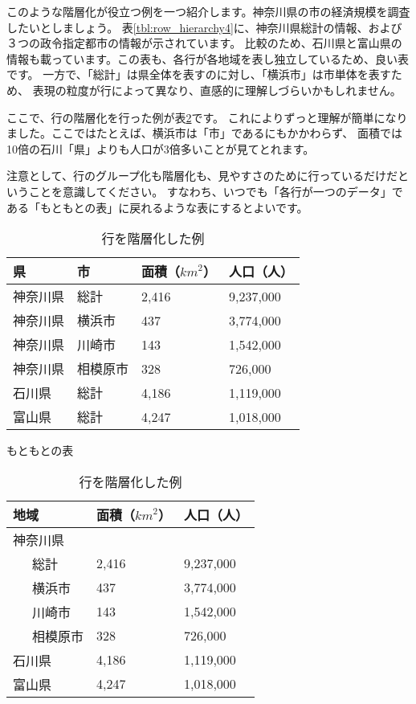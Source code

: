\documentclass[uplatex,onecolumn,9pt,dvipdfmx]{jsarticle}
\newcommand{\Tref}[1]{表\ref{#1}}
\begin{document}
このような階層化が役立つ例を一つ紹介します。神奈川県の市の経済規模を調査したいとしましょう。
\Tref{tbl:row_hierarchy4}に、神奈川県総計の情報、および３つの政令指定都市の情報が示されています。
比較のため、石川県と富山県の情報も載っています。この表も、各行が各地域を表し独立しているため、良い表です。
一方で、「総計」は県全体を表すのに対し、「横浜市」は市単体を表すため、
表現の粒度が行によって異なり、直感的に理解しづらいかもしれません。

ここで、行の階層化を行った例が\Tref{tbl:row_hierarchy5}です。
これによりずっと理解が簡単になりました。ここではたとえば、横浜市は「市」であるにもかかわらず、
面積では10倍の石川「県」よりも人口が3倍多いことが見てとれます。

注意として、行のグループ化も階層化も、見やすさのために行っているだけだということを意識してください。
すなわち、いつでも「各行が一つのデータ」である「もともとの表」に戻れるような表にするとよいです。

\begin{table}[h]
    \begin{minipage}[t]{0.48\linewidth}
        \centering
        \begin{tabular}{@{}llll@{}} \toprule
            県 & 市 & 面積（${km}^2$） & 人口（人） \\ \midrule
            神奈川県 & 総計 & 2,416 & 9,237,000 \\
            神奈川県 & 横浜市 & 437 & 3,774,000 \\
            神奈川県 & 川崎市 & 143 & 1,542,000 \\
            神奈川県 & 相模原市 & 328 & 726,000 \\
            石川県   & 総計 & 4,186 & 1,119,000 \\
            富山県   & 総計 & 4,247 & 1,018,000 \\ \bottomrule   
        \end{tabular}
        \caption{もともとの表}
        \label{tbl:row_hierarchy4}
    \end{minipage}
    \hfill
    \begin{minipage}[t]{0.48\linewidth}
        \centering
        \begin{tabular}{@{}lll@{}} \toprule
            地域 & 面積（${km}^2$） & 人口（人） \\ \midrule
            神奈川県 & & \\
            ~~~総計  & 2,416 & 9,237,000 \\
            ~~~横浜市 & 437 & 3,774,000 \\
            ~~~川崎市 & 143 & 1,542,000 \\
            ~~~相模原市 & 328 & 726,000 \\
            石川県   & 4,186 & 1,119,000 \\
            富山県   & 4,247 & 1,018,000 \\ \bottomrule   
        \end{tabular}
        \caption{行を階層化した例}
        \label{tbl:row_hierarchy5}
    \end{minipage}
\end{table}
\end{document}
